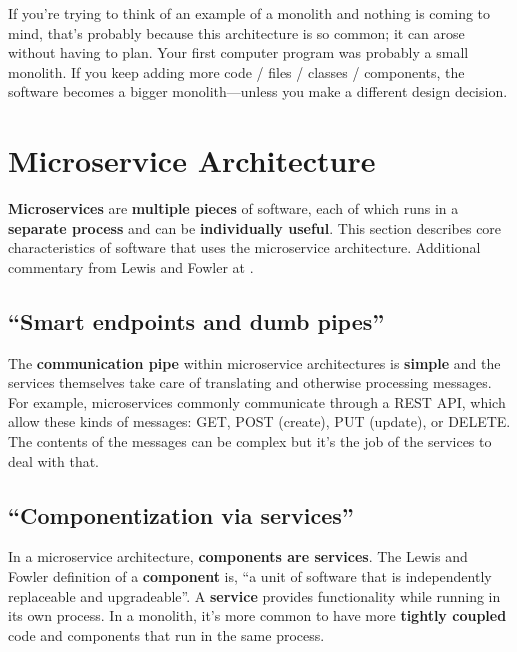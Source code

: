 If you're trying to think of an example of a monolith and nothing is coming to mind, that's probably because this architecture is so common; it can arose without having to plan. Your first computer program was probably a small monolith. If you keep adding more code / files / classes / components, the software becomes a bigger monolith---unless you make a different design decision.

\section{Microservice Architecture}

\textbf{Microservices} are \textbf{multiple pieces} of software, each of which runs in a \textbf{separate process} and can be \textbf{individually useful}. This section describes core characteristics of software that uses the microservice architecture. Additional commentary from Lewis and Fowler at \parencite{fowler2019microservices}. 

\subsection{``Smart endpoints and dumb pipes''}
The \textbf{communication pipe} within microservice architectures is \textbf{simple} and the services themselves take care of translating and otherwise processing messages. For example, microservices commonly communicate through a REST API, which allow these kinds of messages: GET, POST (create), PUT (update), or DELETE. The contents of the messages can be complex but it's the job of the services to deal with that.

\subsection{``Componentization via services''}\marginpar{\componentDef\margindivider}\marginpar{\serviceDef\margindivider}\marginpar{\couplingDef\margindivider}\marginpar{\encapsulationDef}

In a microservice architecture, \textbf{components are services}. The Lewis and Fowler definition of a \textbf{component} is, ``a unit of software that is independently replaceable and upgradeable''. A \textbf{service} provides functionality while running in its own process. In a monolith, it's more common to have more \textbf{tightly coupled} code and components that run in the same process.

